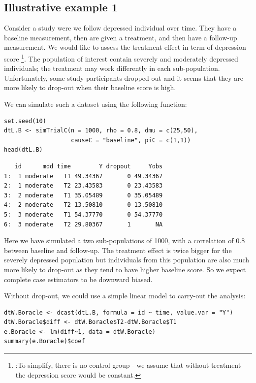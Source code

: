 \documentclass[12pt]{article}
\begin{document}
\clearpage

\subsection{Illustrative example 1}
\label{sec:org6d367ee}

Consider a study were we follow depressed individual over time. They
have a baseline measurement, then are given a treatment, and then have
a follow-up measurement. We would like to assess the treatment effect
in term of depression score \footnote{:To simplify, there is no control
group - we assume that without treatment the depression score would be
constant.}. The population of interest contain severely and moderately
depressed individuals; the treatment may work differently in each
sub-population. Unfortunately, some study participants dropped-out and
it seems that they are more likely to drop-out when their baseline
score is high.

\bigskip

We can simulate such a dataset using the following function:
\lstset{language=r,label= ,caption= ,captionpos=b,numbers=none}
\begin{lstlisting}
set.seed(10)
dtL.B <- simTrialC(n = 1000, rho = 0.8, dmu = c(25,50),
                   causeC = "baseline", piC = c(1,1))
head(dtL.B)
\end{lstlisting}

\begin{verbatim}
   id      mdd time        Y dropout     Yobs
1:  1 moderate   T1 49.34367       0 49.34367
2:  1 moderate   T2 23.43583       0 23.43583
3:  2 moderate   T1 35.05489       0 35.05489
4:  2 moderate   T2 13.50810       0 13.50810
5:  3 moderate   T1 54.37770       0 54.37770
6:  3 moderate   T2 29.80367       1       NA
\end{verbatim}


Here we have simulated a two sub-populations of 1000, with a
correlation of 0.8 between baseline and follow-up. The treatment
effect is twice bigger for the severely depressed population but
individuals from this population are also much more likely to drop-out
as they tend to have higher baseline score. So we expect complete case
estimators to be downward biased.

\bigskip

Without drop-out, we could use a simple linear model to carry-out the
analysis:
\lstset{language=r,label= ,caption= ,captionpos=b,numbers=none}
\begin{lstlisting}
dtW.Boracle <- dcast(dtL.B, formula = id ~ time, value.var = "Y")
dtW.Boracle$diff <- dtW.Boracle$T2-dtW.Boracle$T1
e.Boracle <- lm(diff~1, data = dtW.Boracle)
summary(e.Boracle)$coef
\end{lstlisting}
\end{document}
